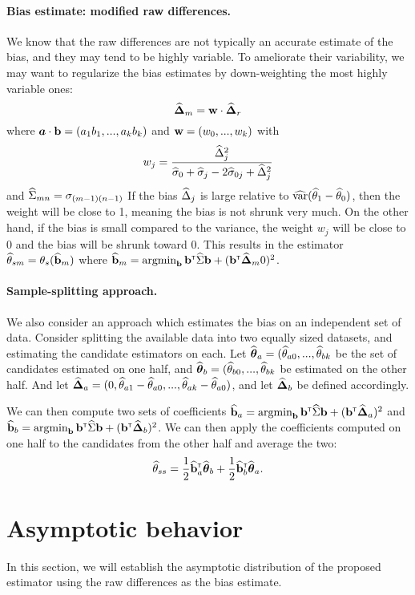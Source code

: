 \documentclass{article}
\begin{document}
\paragraph{Bias estimate: modified raw differences.}
We know that the raw differences are not typically an accurate estimate of the bias, and they may tend to be highly variable. To ameliorate their variability, we may want to regularize the bias estimates by down-weighting the most highly variable ones: 
\[
{\widehat{\boldsymbol{\Delta}}}_m = {\bf w} \cdot {\widehat{\boldsymbol{\Delta}}}_r
\]
where ${\mbox{\boldmath$a$}} \cdot {\bf b} = (a_1b_1, ..., a_kb_k)$ and ${\bf w} = (w_0, ..., w_k)$ with
\[
w_j = \frac{{\widehat\Delta}_j^2}{{\widehat\sigma}_0 + {\widehat\sigma}_j - 2{\widehat\sigma}_{0j} + {\widehat\Delta}_j^2}
\]
and ${\widehat\Sigma}_{mn} = \sigma_{(m-1)(n-1)}$
If the bias ${\widehat\Delta}_j$ is large relative to $\widehat{\mbox{var}}({\widehat\theta}_1 - {\widehat\theta}_0)$, then the weight will be close to 1, meaning the bias is not shrunk very much. On the other hand, if the bias is small compared to the variance, the weight $w_j$ will be close to 0 and the bias will be shrunk toward 0. This results in the estimator ${\widehat\theta}_{sm} = \theta_s({\widehat {{\bf b}}}_m)$ where ${\widehat {{\bf b}}}_m = \mathop{\mbox{argmin}}_{{\bf b}}{\bf b}^{{\sf \scriptscriptstyle{T}}}{\widehat\Sigma}{\bf b} + ({\bf b}^{{\sf \scriptscriptstyle{T}}} {\widehat{\boldsymbol{\Delta}}}_m0)^2$.
\paragraph{Sample-splitting approach.}
We also consider an approach which estimates the bias on an independent set of data. Consider splitting the available data into two equally sized datasets, and estimating the candidate estimators on each. Let ${\widehat{\boldsymbol{\theta}}}_a = ({\widehat\theta}_{a0}, ..., {\widehat\theta}_{bk}$ be the set of candidates estimated on one half, and ${\widehat{\boldsymbol{\theta}}}_b = ({\widehat\theta}_{b0}, ..., {\widehat\theta}_{bk}$ be estimated on the other half. And let ${\widehat{\boldsymbol{\Delta}}}_a = (0, {\widehat\theta}_{a1} - {\widehat\theta}_{a0}, ..., {\widehat\theta}_{ak} - {\widehat\theta}_{a0})$, and let ${\widehat{\boldsymbol{\Delta}}}_b$ be defined accordingly. 

We can then compute two sets of coefficients ${\widehat {{\bf b}}}_a = \mathop{\mbox{argmin}}_{{\bf b}}{\bf b}^{{\sf \scriptscriptstyle{T}}}{\widehat\Sigma}{\bf b} + ({\bf b}^{{\sf \scriptscriptstyle{T}}} {\widehat{\boldsymbol{\Delta}}}_a)^2$ and ${\widehat {{\bf b}}}_b = \mathop{\mbox{argmin}}_{{\bf b}}{\bf b}^{{\sf \scriptscriptstyle{T}}}{\widehat\Sigma}{\bf b} + ({\bf b}^{{\sf \scriptscriptstyle{T}}} {\widehat{\boldsymbol{\Delta}}}_b)^2$. We can then apply the coefficients computed on one half to the candidates from the other half and average the two:
\[
{\widehat\theta}_{ss} = \frac{1}{2}{\widehat {{\bf b}}}_a^{{\sf \scriptscriptstyle{T}}}{\widehat{\boldsymbol{\theta}}}_b + \frac{1}{2}{\widehat {{\bf b}}}_b^{{\sf \scriptscriptstyle{T}}}{\widehat{\boldsymbol{\theta}}}_a.
\]

\section{Asymptotic behavior}
In this section, we will establish the asymptotic distribution of the proposed estimator using the raw differences as the bias estimate. 
\end{document}

